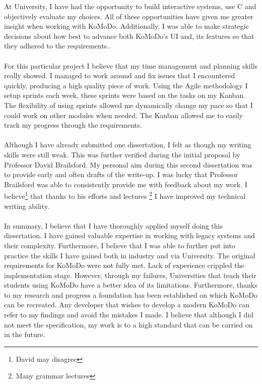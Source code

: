 %
At University, I have had the opportunity to build interactive systems, use C and objectively evaluate my choices. All of these opportunities have given me greater insight when working with KoMoDo. Additionally, I was able to make strategic decisions about how best to advance both KoMoDo's UI and, its features so that they adhered to the requirements..\\\\
%
For this particular project I believe that my time management and planning skills really showed. I managed to work around and fix issues that I encountered quickly, producing a high quality piece of work. Using the Agile methodology I setup sprints each week, these sprints were based on the tasks on my Kanban. The flexibility of using sprints allowed me dynamically change my pace so that I could work on other modules when needed. The Kanban allowed me to easily track my progress through the requirements.\\\\
%
Although I have already submitted one dissertation, I felt as though my writing skills were still weak. This was further verified during the initial proposal by Professor David Brailsford. My personal aim during this second dissertation was to provide early and often drafts of the write-up. I was lucky that Professor Brailsford was able to consistently provide me with feedback about my work. I believe\footnote{David may disagree} that thanks to his efforts and lectures \footnote{Many grammar lectures} I have improved my technical writing ability.\\\\
%
In summary, I believe that I have thoroughly applied myself doing this dissertation. I have gained valuable expertise in working with legacy systems and their complexity. Furthermore, I believe that I was able to further put into practice the skills I have gained both in industry and via University.
%
%
%
The original requirements for KoMoDo were not fully met. Lack of experience crippled the implementation stage. However, through my failures, Universities that teach their students using KoMoDo have a better idea of its limitations. Furthermore, thanks to my research and progress a foundation has been established on which KoMoDo can be recreated. Any developer that wishes to develop a modern KoMoDo can refer to my findings and avoid the mistakes I made. I believe that although I did not meet the specification, my work is to a high standard that can be carried on in the future.
